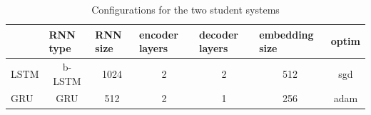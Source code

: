 \documentclass[11pt,a4paper]{article}
\begin{document}
\begin{table}[]
\centering
\begin{tabular}{lcccccc}
\hline
     & \multicolumn{1}{l}{RNN type} & \multicolumn{1}{l}{RNN size} & \multicolumn{1}{l}{encoder layers} & \multicolumn{1}{l}{decoder layers} & \multicolumn{1}{l}{embedding size} & \multicolumn{1}{l}{optim} \\ \hline
LSTM & b-LSTM                         & 1024                         & 2                                  & 2                                  & 512                                & sgd                       \\ \hline
GRU & GRU                          & 512                          & 2                                  & 1                                  & 256                                & adam                      \\ \hline
\end{tabular}
\caption{Configurations for the two student systems}
\label{table:config}
\end{table}
\end{document}
